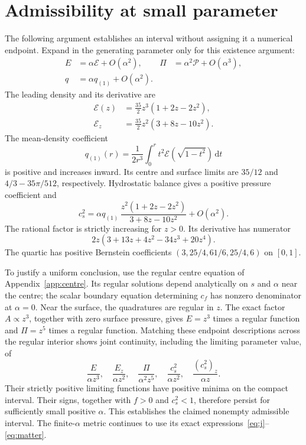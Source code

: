 \documentclass[aps,prd,reprint,a4paper,nofootinbib,floatfix]{revtex4-2}
\newcommand{\dd}{\mathrm d}
\begin{document}
\section{Admissibility at small parameter}
\label{app:admissibility}
The following argument establishes an interval without assigning it a numerical endpoint. Expand in the generating parameter only for this existence argument:
\begin{align}
 E&=\alpha\mathcal E+O(\alpha^2),&
 \Pi&=\alpha^2\mathcal P+O(\alpha^3),\nonumber\\
 q&=\alpha q_{(1)}+O(\alpha^2).
\end{align}
The leading density and its derivative are
\begin{align}
 \mathcal E(z)&=\tfrac{35}{2}z^3(1+2z-2z^2),\nonumber\\
 \mathcal E_z&=\tfrac{35}{2}z^2(3+8z-10z^2).
\end{align}
The mean-density coefficient
\begin{equation}
 q_{(1)}(r)=\frac1{2r^3}\int_0^r t^2\mathcal E(\sqrt{1-t^2})\,\dd t
\end{equation}
is positive and increases inward. Its centre and surface limits are $35/12$ and $4/3-35\pi/512$, respectively. Hydrostatic balance gives a positive pressure coefficient and
\begin{equation}
 c_s^2=\alpha q_{(1)}\,
 \frac{z^2(1+2z-2z^2)}{3+8z-10z^2}+O(\alpha^2).
\end{equation}
The rational factor is strictly increasing for $z>0$. Its derivative has numerator
\begin{equation}
 2z(3+13z+4z^2-34z^3+20z^4).
\end{equation}
The quartic has positive Bernstein coefficients
$(3,25/4,61/6,25/4,6)$ on $[0,1]$.

To justify a uniform conclusion, use the regular centre equation of Appendix~\ref{app:centre}. Its regular solutions depend analytically on $s$ and $\alpha$ near the centre; the scalar boundary equation determining $c_f$ has nonzero denominator at $\alpha=0$. Near the surface, the quadratures are regular in $z$. The exact factor $A\propto z^3$, together with zero surface pressure, gives $E=z^3$ times a regular function and $\Pi=z^5$ times a regular function. Matching these endpoint descriptions across the regular interior shows joint continuity, including the limiting parameter value, of
\begin{equation}
 \frac{E}{\alpha z^3},\quad
 \frac{E_z}{\alpha z^2},\quad
 \frac{\Pi}{\alpha^2z^5},\quad
 \frac{c_s^2}{\alpha z^2},\quad
 \frac{(c_s^2)_z}{\alpha z}.
\end{equation}
Their strictly positive limiting functions have positive minima on the compact interval. Their signs, together with $f>0$ and $c_s^2<1$, therefore persist for sufficiently small positive $\alpha$. This establishes the claimed nonempty admissible interval. The finite-$\alpha$ metric continues to use its exact expressions~\eqref{eq:j}--\eqref{eq:matter}.
\end{document}
